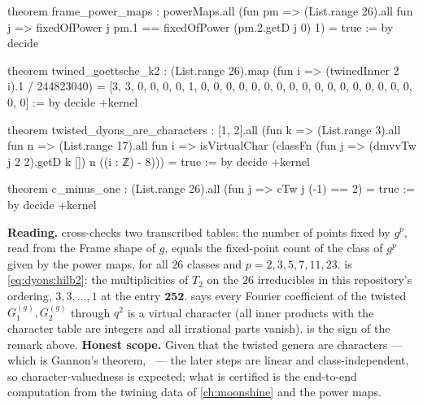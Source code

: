 \begin{leanbox}
\begin{leancode}
theorem frame_power_maps :
    powerMaps.all (fun pm => (List.range 26).all fun j =>
      fixedOfPower j pm.1 == fixedOfPower (pm.2.getD j 0) 1) = true := by decide

theorem twined_goettsche_k2 :
    (List.range 26).map (fun i => (twinedInner 2 i).1 / 244823040) =
      [3, 3, 0, 0, 0, 0, 1, 0, 0, 0, 0, 0, 0, 0, 0, 0, 0, 0, 0, 0, 0, 0, 0, 0,
       0, 0] := by decide +kernel

theorem twisted_dyons_are_characters :
    [1, 2].all (fun k => (List.range 3).all fun n =>
      (List.range 17).all fun i =>
      isVirtualChar (classFn (fun j => (dmvvTw j 2 2).getD k []) n
        ((i : ℤ) - 8))) = true := by decide +kernel

theorem c_minus_one :
    (List.range 26).all (fun j => cTw j (-1) == 2) = true := by decide +kernel
\end{leancode}
\textbf{Reading.}  cross-checks two transcribed tables: the number of
points fixed by $g^p$, read from the Frame shape of $g$, equals the fixed-point count of the
class of $g^p$ given by the power maps, for all $26$ classes and $p=2,3,5,7,11,23$.
 is \eqref{eq:dyons:hilb2}: the multiplicities of $T_2$ on the $26$
irreducibles in this repository's ordering, $3,3,\dots,1$ at the entry $\mathbf{252}$.
 says every Fourier coefficient of the twisted
$G^{(g)}_1,G^{(g)}_2$ through $q^2$ is a virtual character (all inner products with the
character table are integers and all irrational parts vanish).  is the sign
of the remark above. \textbf{Honest scope.} Given that the twisted genera are characters ---
which is Gannon's theorem, \TL\ --- the later steps are linear and class-independent, so
character-valuedness is expected; what is certified is the end-to-end computation from the
twining data of \cref{ch:moonshine} and the power maps.
\end{leanbox}

